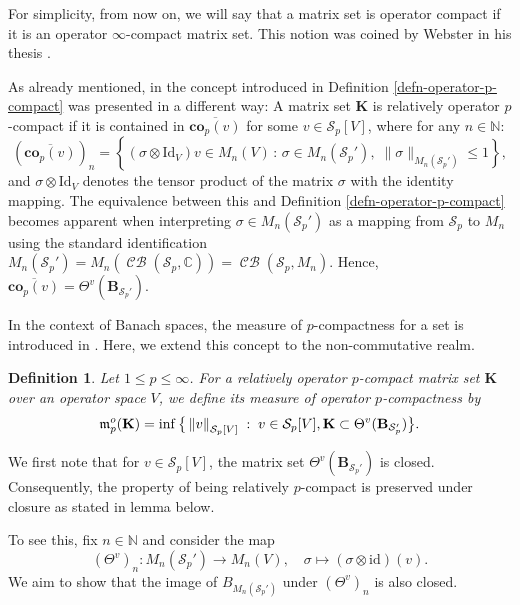 \documentclass[11pt]{amsart}
\DeclareMathOperator{\CB}{\mathcal{CB}}
\newcommand{\n}[1]{ \left\|#1\right\| }
\newcommand{\C}{{\mathbb{C}}}
\newtheorem{definition}[theorem]{Definition}
\numberwithin{equation}{section}
\begin{document}
For simplicity, from now on, we will say that a matrix set is operator compact if it is an operator  $\infty$-compact matrix set. This notion was coined by Webster in his thesis \cite[Def. 4.1.1]{Webster}.



As already mentioned, in \cite{ChaDiGa-Operator-p-compact} the concept introduced in Definition \ref{defn-operator-p-compact} was presented in a different way: A matrix set $\mathbf{K}$ is relatively operator $p$-compact if it is contained in $\overline{\mathbf{co}_p(v)}$ for some $v\in \mathcal{S}_p [V]$, where for any $n \in \mathbb{N}$:
\[
\left(\overline{\mathbf{co}_p(v)}\right)_n = \left\{(\sigma \otimes \text{Id}_V)v \in M_n(V) \,:\, \sigma \in M_n(\mathcal{S}_{p}'), \; \lVert \sigma \rVert_{M_n(\mathcal{S}_{p}')} \leq 1  \right\},
\]
and $\sigma \otimes \text{Id}_V$ denotes the tensor product of the matrix $\sigma$ with the identity mapping.
The equivalence between this and Definition \ref{defn-operator-p-compact} becomes apparent when interpreting $\sigma \in M_n(\mathcal{S}_{p}')$ as a mapping from $\mathcal{S}_p$ to $M_n$ using the standard identification $ M_n(\mathcal{S}_p') = M_n(\CB(\mathcal{S}_p,\C)) = \CB(\mathcal{S}_p,M_n)$. Hence, $\overline{\mathbf{co}_p(v)}=\Theta^v(\mathbf B_{\mathcal{S}_{p}'})$.




In the context of Banach spaces, the measure of $p$-compactness for a set is introduced in \cite[Def. 2.1]{Galicer-Lassalle-Turco}. Here, we extend this concept to the non-commutative realm.

\begin{definition}\label{def-measure-of-p-compactness}
Let $1 \le p \le \infty$. For a relatively operator $p$-compact matrix set $\mathbf{K}$ over an operator space $V$, we define its \emph{measure of operator $p$-compactness} by
\[
\frak m_p^o(\mathbf{K}) = \inf \big\{ \n{v}_{\mathcal{S}_p[V]} \;:\; v \in \mathcal{S}_p[V],  \mathbf{K}\subset \Theta^v(\mathbf{B}_{\mathcal{S}_p'})  \big\}.
\]
\end{definition}


We first note that for $v \in \mathcal{S}_p[V]$, the matrix set $\Theta^v(\mathbf{B}_{\mathcal{S}_p'})$ is closed. Consequently, the property of being relatively $p$-compact is preserved under closure as stated in lemma below.  

To see this, fix $n \in \mathbb{N}$ and consider the map  
\[
(\Theta^v)_n: M_n(\mathcal{S}_{p}') \to M_n(V), \quad \sigma \mapsto (\sigma \otimes \mathrm{id})(v).
\]  
We aim to show that the image of $B_{M_n(\mathcal{S}_{p}')}$ under $(\Theta^v)_n$ is also closed.  
\end{document}
